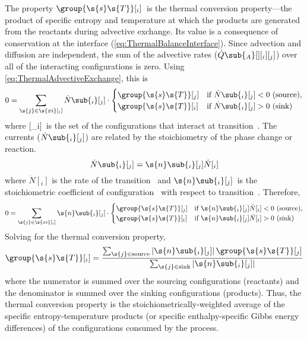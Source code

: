 The property $\group{\s{s}\s{T}}[_i]$~is the thermal conversion property---the product of specific entropy and temperature at which the products are generated from the reactants during advective exchange.  Its value is a consequence of conservation at the interface (\autoref{eq:ThermalBalanceInterface}).  Since advection and diffusion are independent, the sum of the advective rates ($\dot{Q}\sub{_A}[ ][_i][_j]$) over all of the interacting configurations is zero.  Using \autoref{eq:ThermalAdvectiveExchange}, this is
\begin{equation}
  0 = \sum_{\s{j} \in \s{xi}[_i]}\dot{N}\sub{_i}[_j]\cdot
  \begin{cases}%
    \group{\s{s}\s{T}}[_j] & \text{if $\dot{N}\sub{_i}[_j] < 0$ (source),} \\
    \group{\s{s}\s{T}}[_i] & \text{if $\dot{N}\sub{_i}[_j] > 0$ (sink)}
  \end{cases}
\end{equation}
where [_i]~is the set of the configurations that interact at transition~.  The currents ($\dot{N}\sub{_i}[_j]$) are related by the stoichiometry of the phase change or reaction.
\begin{equation}
  \dot{N}\sub{_i}[_j] = \s{n}\sub{_i}[_j]\dot{N}[_i]
\end{equation}
where $\dot{N}[_i]$ is the rate of the transition~ and $\s{n}\sub{_i}[_j]$~is the stoichiometric coefficient of configuration~ with respect to transition~.  Therefore,
\begin{equation}
  0 = \sum_{\s{j} \in \s{xi}[_i]}\s{n}\sub{_i}[_j]\cdot
  \begin{cases}%
    \group{\s{s}\s{T}}[_j] & \text{if $\s{n}\sub{_i}[_j]\dot{N}[_i] < 0$ (source),} \\
    \group{\s{s}\s{T}}[_i] & \text{if $\s{n}\sub{_i}[_j]\dot{N}[_i] > 0$ (sink)}
  \end{cases}
\end{equation}
Solving for the thermal conversion property,
\begin{equation}
  \label{eq:ThermalConversionProperty}
  \group{\s{s}\s{T}}[_i] = \frac{\sum_{\s{j}\in\text{source}}\left|\s{n}\sub{_i}[_j]\right|\group{\s{s}\s{T}}[_j]}{\sum_{\s{j}\in\text{sink}}\left|\s{n}\sub{_i}[_j]\right|}
\end{equation}
where the numerator is summed over the sourcing configurations (reactants) and the denominator is summed over the sinking configurations (products).  Thus, the thermal conversion property is the stoichiometrically-weighted average of the specific entropy-temperature products (or specific enthalpy-specific Gibbs energy differences) of the configurations consumed by the process.



